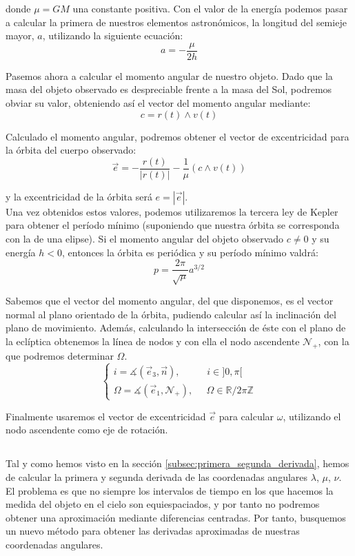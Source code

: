 \documentclass[11pt]{article}
\begin{document}
\noindent donde $\mu=GM$ una constante positiva. Con el valor de la energía podemos pasar a calcular la primera de nuestros elementos astronómicos, la longitud del semieje mayor, $a$, utilizando la siguiente ecuación:
\[
a=-\frac{\mu}{2h}
\]

Pasemos ahora a calcular el momento angular de nuestro objeto. Dado que la masa del objeto observado es despreciable frente a la masa del Sol, podremos obviar su valor, obteniendo así el vector del momento angular mediante:
\[
c=r(t)\wedge v(t)
\]

Calculado el momento angular, podremos obtener el vector de excentricidad para la órbita del cuerpo observado:
\[
\vec{e}=-\frac{r(t)}{|r(t)|}-\frac{1}{\mu}(c\wedge v(t))
\]

\noindent y la excentricidad de la órbita será $e=|\vec{e}|$.\\

Una vez obtenidos estos valores, podemos utilizaremos la tercera ley de Kepler para obtener el período mínimo (suponiendo que nuestra órbita se corresponda con la de una elipse). Si el momento angular del objeto observado $c\neq0$ y su energía $h<0$, entonces la órbita es periódica y su período mínimo valdrá:
\[
p=\frac{2\pi}{\sqrt{\mu}}a^{3/2}
\]

Sabemos que el vector del momento angular, del que disponemos, es el vector normal al plano orientado de la órbita, pudiendo calcular así la inclinación del plano de movimiento. Además, calculando la intersección de éste con el plano de la eclíptica obtenemos la línea de nodos y con ella el nodo ascendente $\mathcal{N}_+$, con la que podremos determinar $\Omega$.
\[
\left\{
\begin{array}{l}
	i=\measuredangle(\vec{e}_3,\vec{n}), \; \; \; \; \; \; \; \; \; \; i\in]0,\pi[\\
	\Omega=\measuredangle(\vec{e}_1, \mathcal{N}_+), \; \; \; \; \; \Omega\in\mathbb{R}/2\pi\mathbb{Z}
\end{array}
\right.
\]

Finalmente usaremos el vector de excentricidad $\vec{e}$ para calcular $\omega$, utilizando el nodo ascendente como eje de rotación.\\


\subsection{}
\label{subsec:series_potencias}
Tal y como hemos visto en la sección \ref{subsec:primera_segunda_derivada}, hemos de calcular la primera y segunda derivada de las coordenadas angulares $\lambda$, $\mu$, $\nu$. El problema es que no siempre los intervalos de tiempo en los que hacemos la medida del objeto en el cielo son equiespaciados, y por tanto no podremos obtener una aproximación mediante diferencias centradas. Por tanto, busquemos un nuevo método para obtener las derivadas aproximadas de nuestras coordenadas angulares.\\
\end{document}
